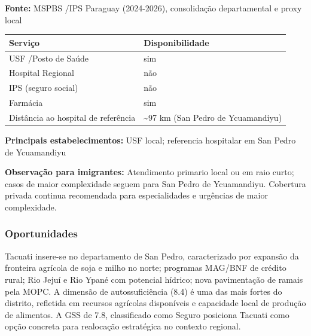 \textbf{Fonte:} MSPBS /\allowbreak  IPS Paraguay (2024-2026), consolidação
departamental e proxy local

{\def\LTcaptype{none} %
\begin{longtable}[]{@{}
  >{\raggedright\arraybackslash}p{}
  >{\raggedright\arraybackslash}p{}@{}}
\toprule\noalign{}
\begin{minipage}[b]{\linewidth}\raggedright
Serviço
\end{minipage} & \begin{minipage}[b]{\linewidth}\raggedright
Disponibilidade
\end{minipage} \\
\midrule\noalign{}
\endhead
\bottomrule\noalign{}
\endlastfoot
USF /\allowbreak  Posto de Saúde & sim \\
Hospital Regional & não \\
IPS (seguro social) & não \\
Farmácia & sim \\
Distância ao hospital de referência & \textasciitilde97 km (San Pedro de
Ycuamandiyu) \\
\end{longtable}
}

\textbf{Principais estabelecimentos:} USF local; referencia hospitalar
em San Pedro de Ycuamandiyu

\textbf{Observação para imigrantes:} Atendimento primario local ou em
raio curto; casos de maior complexidade seguem para San Pedro de
Ycuamandiyu. Cobertura privada continua recomendada para especialidades
e urgências de maior complexidade.
\newpage

\subsubsection*{Oportunidades}\label{oport-tacuati-0210}
Tacuati insere-se no departamento de San Pedro, caracterizado por expansão da fronteira agrícola de soja e milho no norte; programas MAG/BNF de crédito rural; Rio Jejuí e Rio Ypané com potencial hídrico; nova pavimentação de ramais pela MOPC. A dimensão de autossuficiência (8.4) é uma das mais fortes do distrito, refletida em recursos agrícolas disponíveis e capacidade local de produção de alimentos. A GSS de 7.8, classificado como Seguro posiciona Tacuati como opção concreta para realocação estratégica no contexto regional.

